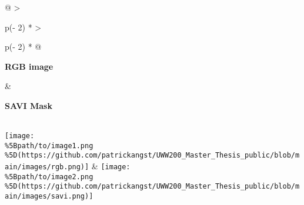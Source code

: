 \documentclass[
]{article}
\begin{document}
\begin{longtable}[]{@{}
  >{\raggedright\arraybackslash}p{(\columnwidth - 2\tabcolsep) * }
  >{\raggedright\arraybackslash}p{(\columnwidth - 2\tabcolsep) * }@{}}
\toprule\noalign{}
\begin{minipage}[b]{\linewidth}\raggedright
\textbf{RGB image}
\end{minipage} & \begin{minipage}[b]{\linewidth}\raggedright
\textbf{SAVI Mask}
\end{minipage} \\
\midrule\noalign{}
\endhead
\bottomrule\noalign{}
\endlastfoot
\texttt{[image: \\\%5Bpath/to/image1.png\\\%5D(https://github.com/patrickangst/UWW200\_Master\_Thesis\_public/blob/main/images/rgb.png)]}
&
\texttt{[image: \\\%5Bpath/to/image2.png\\\%5D(https://github.com/patrickangst/UWW200\_Master\_Thesis\_public/blob/main/images/savi.png)]} \\
\end{longtable}
\end{document}
